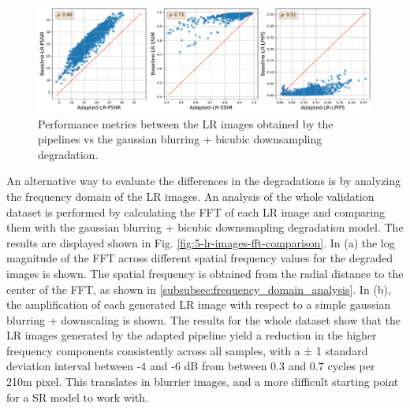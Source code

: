         \begin{figure}[H]
            \centering
            \includegraphics[width=\textwidth]{Includes/5-source-domain-lr-performance-scatterplot.pdf}
            \caption{Performance metrics between the LR images obtained by the pipelines vs the gaussian blurring + bicubic downsampling degradation.}
            \label{fig:5-source-domain-lr-performance-scatterplot}
        \end{figure}




        An alternative way to evaluate the differences in the degradations is by analyzing the frequency domain of the LR images.
        An analysis of the whole validation dataset is performed by calculating the FFT of each LR image and comparing them with the gaussian blurring + bicubic downsmapling degradation model.
        The results are displayed shown in Fig. \ref{fig:5-lr-images-fft-comparison}. 
        In (a) the log magnitude of the FFT across different spatial frequency values for the degraded images is shown. 
        The spatial frequency is obtained from the radial distance to the center of the FFT, as shown in \ref{subsubsec:frequency_domain_analysis}.
        In (b), the amplification of each generated LR image with respect to a simple gaussian blurring + downscaling is shown. 
        The results for the whole dataset show that the LR images generated by the adapted pipeline yield a reduction in the higher frequency components consistently across all samples, with a ± 1 standard deviation interval between -4 and -6 dB from between 0.3 and 0.7 cycles per 210m pixel.
        This translates in blurrier images, and a more difficult starting point for a SR model to work with.

